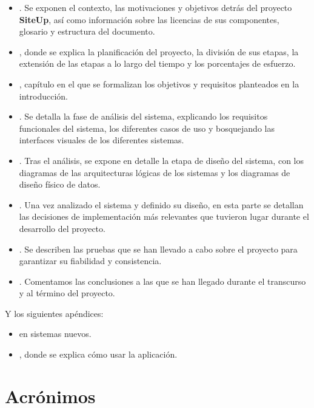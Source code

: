 \begin{itemize}
\item \textbf{}. Se exponen el contexto, las motivaciones y
  objetivos detrás del proyecto \textbf{SiteUp}, así como información sobre las
  licencias de sus componentes, glosario y estructura del documento.

\item \textbf{}, donde se explica la planificación del
  proyecto, la división de sus etapas, la extensión de las etapas a lo largo del
  tiempo y los porcentajes de esfuerzo.

\item \textbf{}, capítulo en el que se formalizan los
  objetivos y requisitos planteados en la introducción.

\item \textbf{}. Se detalla la fase de análisis del
  sistema, explicando los requisitos funcionales del sistema, los diferentes
  casos de uso y bosquejando las interfaces visuales de los diferentes sistemas.

\item \textbf{}. Tras el análisis, se expone en detalle
  la etapa de diseño del sistema, con los diagramas de las arquitecturas lógicas
  de los sistemas y los diagramas de diseño físico de datos.

\item \textbf{}. Una vez analizado el sistema y
  definido su diseño, en esta parte se detallan las decisiones de implementación
  más relevantes que tuvieron lugar durante el desarrollo del proyecto.

\item \textbf{}. Se describen las pruebas que se han
  llevado a cabo sobre el proyecto para garantizar su fiabilidad y consistencia.

\item \textbf{}. Comentamos las conclusiones a las
  que se han llegado durante el transcurso y al término del proyecto.
\end{itemize}

Y los siguientes apéndices:
\begin{itemize}
\item \textbf{} en sistemas nuevos.
\item \textbf{}, donde se explica cómo usar la aplicación.
\end{itemize}

\section{Acrónimos}




